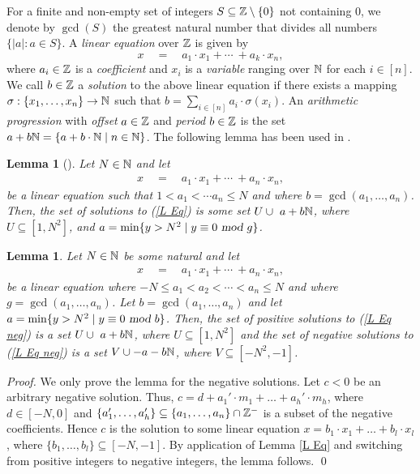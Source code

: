 \documentclass[times,envcountsame]{llncs}
\newtheorem{lemma}[theorem]{{\bf Lemma}}
\begin{document}
For a finite and non-empty set of integers $S\subseteq \mathbb{Z}\setminus\{0\}$ not
containing $0$, we denote by {\em $\gcd(S)$} the greatest natural number that
divides all numbers $\{|a|: a\in S\}$.
A {\em linear equation} over $\mathbb{Z}$ is given by
$$
x\quad =\quad a_1\cdot x_1 + \cdots\ + a_k\cdot x_n,
$$
where $a_i\in\mathbb{Z}$ is a {\em coefficient} and $x_i$ is a {\em variable}
ranging over $\mathbb{N}$ for each $i\in[n]$.
We call $b\in\mathbb{Z}$ a {\em solution} to the above linear equation if there exists a
mapping $\sigma:\{x_1,\ldots,x_n\}\rightarrow\mathbb{N}$ such that
$b=\sum_{i\in[n]} a_i\cdot\sigma(x_i)$.
An {\em arithmetic progression} with {\em offset} $a\in\mathbb{Z}$ and {\em period
$b\in\mathbb{Z}$} is the set $a+b\mathbb{N}=\{a+b\cdot\mathbb{N}\mid n\in\mathbb{N}\}$.
The following lemma has been used in \cite{AnthonyIPL,Chrobak,Shallit}.

\begin{lemma}[\cite{lookup citation}]\label{L NT}
Let $N\in\mathbb{N}$ and let
\begin{eqnarray}
x\quad=\quad a_1\cdot x_1 + \cdots\ + a_n\cdot x_n,\label{L Eq}
\end{eqnarray}
be a linear equation such that $1<a_1<\cdots a_n\leq N$ and where
$b=\gcd(a_1,\ldots,a_n)$.
Then, the set of solutions to (\ref{L Eq}) is some set
$U\cup\ a+b\mathbb{N}$,
where $U\subseteq[1,N^2]$,
and
$a=\min\{y>N^2\mid y\equiv 0\textsl{ mod }g\}$.
\end{lemma}


\begin{lemma}
Let $N\in\mathbb{N}$ be some natural and let
\begin{eqnarray}
x\quad=\quad a_1\cdot x_1 + \cdots\ + a_n\cdot x_n,\label{L Eq neg}
\end{eqnarray}
be a linear equation
where $-N\leq a_1<a_2<\cdots <a_n\leq N$ and where $g=\gcd(a_1,\ldots,a_n)$.
Let $b=\gcd(a_1,\ldots,a_n)$ and let
$a=\min\{y>N^2\mid y\equiv 0\textsl{ mod }b\}$.
Then, the set of positive solutions to (\ref{L Eq neg}) is a set
$U\cup\  a+ b\mathbb{N}$, where $U\subseteq[1,N^2]$ and the
set of negative solutions to (\ref{L Eq neg}) is a set
$V\cup -a-b\mathbb{N}$, where $V\subseteq[-N^2,-1]$.
\end{lemma}
\begin{proof}
We only prove the lemma for the negative solutions.
Let $c<0$ be an arbitrary negative solution. Thus,
$c=d+a_1'\cdot m_1+\ldots +a_h'\cdot m_h$, where
$d\in[-N,0]$ and
$\{a_1',\ldots,a_h'\}\subseteq\{a_1,\ldots,a_n\}\cap\mathbb{Z}^-$ is a subset of
the negative coefficients.
Hence $c$ is the solution
to some linear equation $x=b_1\cdot x_1+\ldots +b_l\cdot x_l$, where
$\{b_1,\ldots,b_l\}\subseteq[-N,-1]$. By application of Lemma
\ref{L Eq} and switching from positive integers to negative integers, the lemma
follows.
\qed
\end{proof}
\end{document}
